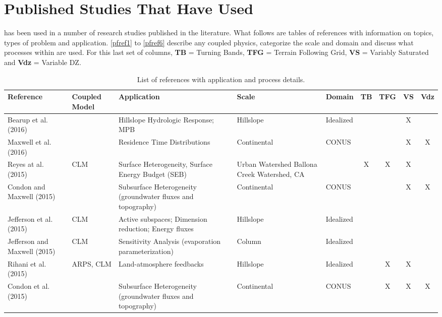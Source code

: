 \section{Published Studies That Have Used \parflow{}}
\label{lit_table}

\parflow{} has been used in a number of research studies published in the literature. 
What follows are tables of \parflow{} references with information on topics, types of problem and
application.  \ref{pfref1} to \ref{pfref6} describe any coupled physics, 
categorize the scale and domain and discuss what processes within \parflow{} are used.  For this last
set of columns, {\bf TB} = Turning Bands, {\bf TFG} = Terrain Following Grid, {\bf VS} = Variably Saturated
and {\bf Vdz} = Variable DZ.

{\scriptsize
\begin{table}
\renewcommand{\arraystretch}{2.5}
\center
\caption{List of \parflow{} references with application and process details.}
\begin{tabular}{ l  p{1.5cm} p{2cm} p{1.5cm} p{1.5cm} | c | c | c | c }
\bf{Reference} & \bf{Coupled Model} & \bf{Application} & \bf{Scale} & \bf{Domain} & \bf{TB} & \bf{TFG} & \bf{VS} & \bf{Vdz} \\ 
\hline{}
\cite{Bearup2016}   Bearup et al. (2016) & & Hillslope Hydrologic Response; MPB & Hillslope     & Idealized & & & X & \\
\cite{Maxwell2016} Maxwell et al. (2016) & & Residence Time Distributions       & Continental	& CONUS     & & & X & X \\	
\cite{Reyes2015} Reyes at al. (2015)     & CLM & Surface Heterogeneity, Surface Energy Budget (SEB) & Urban Watershed Ballona Creek Watershed, CA  & & X&X &X  \\
\cite{Condon2015a} Condon and Maxwell (2015) & & Subsurface Heterogeneity (groundwater fluxes and topography) & Continental & CONUS  & & & X & X \\
\cite{Jefferson2015} Jefferson et al. (2015) & CLM & Active subspaces; Dimension reduction; Energy fluxes & Hillslope & Idealized   & & & & \\ 				
\cite{Jefferson2015a} Jefferson and Maxwell (2015)& CLM & Sensitivity Analysis (evaporation parameterization) & Column & Idealized   & & & & \\ 				
\cite{Rihani2015} Rihani et al. (2015) & ARPS, CLM & Land-atmosphere feedbacks & Hillslope & Idealized      & & X & X & \\
\cite{Condon2015} Condon et al. (2015) & & Subsurface Heterogeneity (groundwater fluxes and topography) & Continental & CONUS & &X &X & X  \\			

\end{tabular}
\end{table}}
